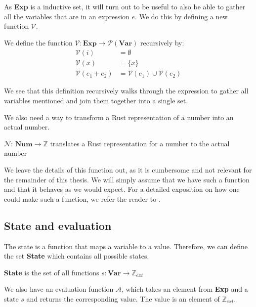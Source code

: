 As \textbf{Exp} is a inductive set, it will turn out to be useful to also be able to gather all the variables that are in an expression $e$. We do this by defining a new function $\mathcal{V}$.

\begin{definition}
We define the function $\mathcal{V}: \textbf{Exp} \to \mathcal{P}(\textbf{Var})$ recursively by:
\begin{align*}
    \mathcal{V}(i)          &= \emptyset
\\  \mathcal{V}(x)          &= \{ x \}
\\  \mathcal{V}(e_1 + e_2)  &= \mathcal{V}(e_1) \cup \mathcal{V}(e_2)
\end{align*}
\end{definition}

We see that this definition recursively walks through the expression to gather all variables mentioned and join them together into a single set. 

We also need a way to transform a Rust representation of a number into an actual number. 

\begin{infdefinition}
$\mathcal{N}$: $\textbf{Num} \to \mathbb{Z}$ translates a Rust representation for a number to the actual number
\end{infdefinition}

We leave the details of this function out, as it is cumbersome and not relevant for the remainder of this thesis. We will simply assume that we have such a function and that it behaves as we would expect. For a detailed exposition on how one could make such a function, we refer the reader to  \cite{nielson1992semantics}. 

\subsection*{State and evaluation}
The state is a function that maps a variable to a value. Therefore, we can define the set \textbf{State} which contains all possible states. 

\begin{definition}
\textbf{State} is the set of all functions $s: \textbf{Var} \to \mathbb{Z}_{ext}$
\end{definition}

We also have an evaluation function $\mathcal{A}$, which takes an element from \textbf{Exp} and a state $s$ and returns the corresponding value. The value is an element of $\mathbb{Z}_{ext}$.

